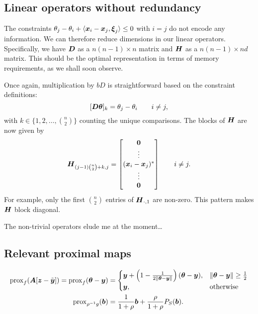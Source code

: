 \documentclass{article}
\begin{document}
\subsection*{Linear operators without redundancy}

The constraints \(\theta_{j} - \theta_{i} + \langle{\boldsymbol{x}_{i} - \boldsymbol{x}_{j}, \boldsymbol{\xi}_{j}}\rangle \le 0\) with \(i = j\) do not encode any information.
We can therefore reduce dimensions in our linear operators.
Specifically, we have \(\boldsymbol{D}\) as a \(n(n-1) \times n\) matrix and \(\boldsymbol{H}\) as a \(n(n-1) \times nd\) matrix.
This should be the optimal representation in terms of memory requirements, as we shall soon observe.

Once again, multiplication by \(bD\) is straightforward based on the constraint definitions:
\begin{equation}
    \label{eq:operator_D_efficient}
    [\boldsymbol{D} \boldsymbol{\theta}]_{k}
    =
    \theta_{j} - \theta_{i}
\qquad i \neq j, \\
\end{equation}
with \(k \in \{1, 2, \ldots, \binom{n}{2}\}\) counting the unique comparisons.
The blocks of \(\boldsymbol{H}\) are now given by
\begin{equation}
    \boldsymbol{H}_{(j-1)\binom{n}{2}+k,j}
    =
    \begin{bmatrix}
        \boldsymbol{0} \\
        \vdots \\
        (\boldsymbol{x}_{i} - \boldsymbol{x}_{j})^{\ast} \\
        \vdots \\
        \boldsymbol{0}
    \end{bmatrix}
    \qquad i \neq j.
\end{equation}
For example, only the first \(\binom{n}{2}\) entries of \(\boldsymbol{H}_{\cdot,1}\) are non-zero.
This pattern makes \(\boldsymbol{H}\) block diagonal.

The non-trivial operators elude me at the moment\ldots

\subsection*{Relevant proximal maps}

\begin{equation*}
    \begin{split}
        \mathop{\rm prox}\nolimits_{f}(\boldsymbol{A}[\boldsymbol{z}-\tilde{\boldsymbol{y}}])
        =
        \mathop{\rm prox}\nolimits_{f}(\boldsymbol{\theta} - \boldsymbol{y})
        &=
        \begin{cases}
            \boldsymbol{y} + \left(1 - \frac{1}{2 \|\boldsymbol{\theta} - \boldsymbol{y}\|}\right) (\boldsymbol{\theta} - \boldsymbol{y}),
                & \|\boldsymbol{\theta} - \boldsymbol{y}\| \ge \frac{1}{2} \\
            \boldsymbol{y},
                & \text{otherwise}
        \end{cases} \\
        \mathop{\rm prox}\nolimits_{\rho^{-1} g}(\boldsymbol{b})
        &=
        \frac{1}{1 + \rho} \boldsymbol{b}
            + \frac{\rho}{1 + \rho} P_{S}(\boldsymbol{b}).
    \end{split}
\end{equation*}
\end{document}
